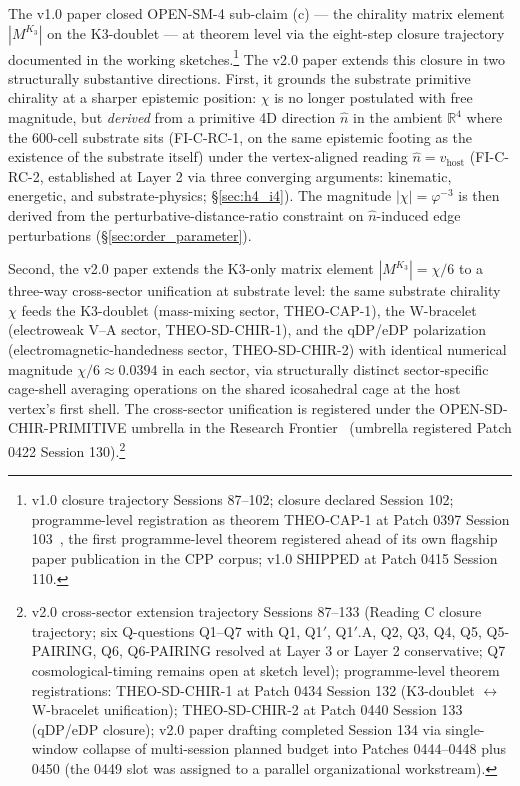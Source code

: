 \documentclass[11pt,letterpaper]{article}
\newcommand{\phig}{\varphi}
\newcommand{\Kthree}{\ensuremath{K_3}}
\begin{document}
The v1.0 paper closed OPEN-SM-4 sub-claim (c) --- the chirality matrix element $|M^{\Kthree}|$ on the K3-doublet --- at theorem level via the eight-step closure trajectory documented in the working sketches.\footnote{v1.0 closure trajectory Sessions 87--102; closure declared Session 102; programme-level registration as theorem THEO-CAP-1 at Patch 0397 Session 103~\cite{abshier_theorem_registry}, the first programme-level theorem registered ahead of its own flagship paper publication in the CPP corpus; v1.0 SHIPPED at Patch 0415 Session 110.} The v2.0 paper extends this closure in two structurally substantive directions. First, it grounds the substrate primitive chirality at a sharper epistemic position: $\chi$ is no longer postulated with free magnitude, but \emph{derived} from a primitive 4D direction $\hat{n}$ in the ambient $\mathbb{R}^4$ where the 600-cell substrate sits (FI-C-RC-1, on the same epistemic footing as the existence of the substrate itself) under the vertex-aligned reading $\hat{n} = v_{\text{host}}$ (FI-C-RC-2, established at Layer 2 via three converging arguments: kinematic, energetic, and substrate-physics; \S\ref{sec:h4_i4}). The magnitude $|\chi| = \phig^{-3}$ is then derived from the perturbative-distance-ratio constraint on $\hat{n}$-induced edge perturbations (\S\ref{sec:order_parameter}).

Second, the v2.0 paper extends the K3-only matrix element $|M^{\Kthree}| = \chi/6$ to a three-way cross-sector unification at substrate level: the same substrate chirality $\chi$ feeds the K3-doublet (mass-mixing sector, THEO-CAP-1), the W-bracelet (electroweak V--A sector, THEO-SD-CHIR-1), and the qDP/eDP polarization (electromagnetic-handedness sector, THEO-SD-CHIR-2) with identical numerical magnitude $\chi/6 \approx 0.0394$ in each sector, via structurally distinct sector-specific cage-shell averaging operations on the shared icosahedral cage at the host vertex's first shell. The cross-sector unification is registered under the OPEN-SD-CHIR-PRIMITIVE umbrella in the Research Frontier~\cite{abshier_research_frontier} (umbrella registered Patch 0422 Session 130).\footnote{v2.0 cross-sector extension trajectory Sessions 87--133 (Reading C closure trajectory; six Q-questions Q1--Q7 with Q1, Q1$'$, Q1$'$.A, Q2, Q3, Q4, Q5, Q5-PAIRING, Q6, Q6-PAIRING resolved at Layer 3 or Layer 2 conservative; Q7 cosmological-timing remains open at sketch level); programme-level theorem registrations: THEO-SD-CHIR-1 at Patch 0434 Session 132 (K3-doublet $\leftrightarrow$ W-bracelet unification); THEO-SD-CHIR-2 at Patch 0440 Session 133 (qDP/eDP closure); v2.0 paper drafting completed Session 134 via single-window collapse of multi-session planned budget into Patches 0444--0448 plus 0450 (the 0449 slot was assigned to a parallel organizational workstream).}
\end{document}

